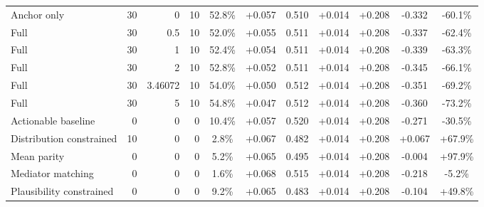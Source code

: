 \begin{table}[htbp]
\begin{tabular}{lrrrccccccc}
Anchor only & 30 & 0 & 10 & 52.8\% & +0.057 & 0.510 & +0.014 & +0.208 & -0.332 & -60.1\% \\
Full & 30 & 0.5 & 10 & 52.0\% & +0.055 & 0.511 & +0.014 & +0.208 & -0.337 & -62.4\% \\
Full & 30 & 1 & 10 & 52.4\% & +0.054 & 0.511 & +0.014 & +0.208 & -0.339 & -63.3\% \\
Full & 30 & 2 & 10 & 52.8\% & +0.052 & 0.511 & +0.014 & +0.208 & -0.345 & -66.1\% \\
Full & 30 & 3.46072 & 10 & 54.0\% & +0.050 & 0.512 & +0.014 & +0.208 & -0.351 & -69.2\% \\
Full & 30 & 5 & 10 & 54.8\% & +0.047 & 0.512 & +0.014 & +0.208 & -0.360 & -73.2\% \\
Actionable baseline & 0 & 0 & 0 & 10.4\% & +0.057 & 0.520 & +0.014 & +0.208 & -0.271 & -30.5\% \\
Distribution constrained & 10 & 0 & 0 & 2.8\% & +0.067 & 0.482 & +0.014 & +0.208 & +0.067 & +67.9\% \\
Mean parity & 0 & 0 & 0 & 5.2\% & +0.065 & 0.495 & +0.014 & +0.208 & -0.004 & +97.9\% \\
Mediator matching & 0 & 0 & 0 & 1.6\% & +0.068 & 0.515 & +0.014 & +0.208 & -0.218 & -5.2\% \\
Plausibility constrained & 0 & 0 & 0 & 9.2\% & +0.065 & 0.483 & +0.014 & +0.208 & -0.104 & +49.8\% \\
\bottomrule
\end{tabular}
\end{table}